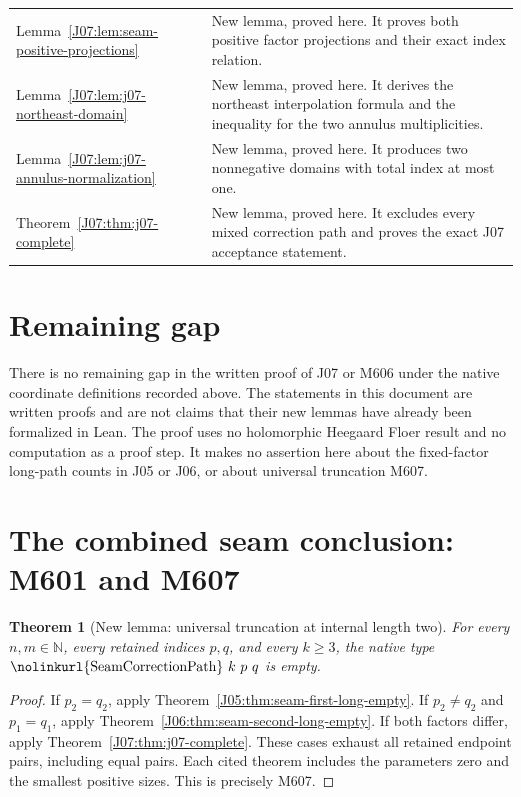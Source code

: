 \documentclass[11pt,oneside]{report}
\newtheorem{theorem}{Theorem}[section]
\theoremstyle{definition}
\numberwithin{equation}{section}
\newcommand{\decl}[1]{\textnormal{\nolinkurl{#1}}}
\begin{document}
\begin{longtable}{p{}p{}}
Lemma~\ref{J07:lem:seam-positive-projections}
& New lemma, proved here. It proves both positive factor projections
and their exact index relation. \\
Lemma~\ref{J07:lem:j07-northeast-domain}
& New lemma, proved here. It derives the northeast interpolation
formula and the inequality for the two annulus multiplicities. \\
Lemma~\ref{J07:lem:j07-annulus-normalization}
& New lemma, proved here. It produces two nonnegative domains with
total index at most one. \\
Theorem~\ref{J07:thm:j07-complete}
& New lemma, proved here. It excludes every mixed correction path
and proves the exact J07 acceptance statement. \\
\bottomrule
\end{longtable}
\normalsize

\section{Remaining gap}

There is no remaining gap in the written proof of J07 or M606 under
the native coordinate definitions recorded above.
The statements in this document are written proofs and are not claims
that their new lemmas have already been formalized in Lean.
The proof uses no holomorphic Heegaard Floer result and no computation
as a proof step.
It makes no assertion here about the fixed-factor long-path counts in
J05 or J06, or about universal truncation M607.




\section{The combined seam conclusion: M601 and M607}

\begin{theorem}[New lemma: universal truncation at internal length two]
\label{seam:universal-truncation}
For every $n,m\in\mathbb N$, every retained indices $p,q$, and every
$k\geq3$, the native type $\decl{SeamCorrectionPath}\ k\ p\ q$ is empty.
\end{theorem}
\begin{proof}
If $p_2=q_2$, apply Theorem~\ref{J05:thm:seam-first-long-empty}.
If $p_2\ne q_2$ and $p_1=q_1$, apply
Theorem~\ref{J06:thm:seam-second-long-empty}.
If both factors differ, apply Theorem~\ref{J07:thm:j07-complete}.
These cases exhaust all retained endpoint pairs, including equal pairs.
Each cited theorem includes the parameters zero and the smallest
positive sizes. This is precisely M607.
\end{proof}
\end{document}
